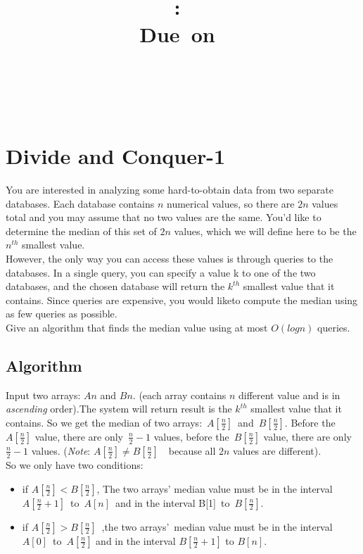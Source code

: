 \documentclass{article}
\title{
\vspace{2in}
\textmd{\textbf{\hmwkClass:\ \hmwkTitle}}\\
\normalsize\vspace{0.1in}\small{Due\ on\ \hmwkDueDate}\\
\vspace{0.1in}\large{\textit{\hmwkClassInstructor\ \hmwkClassTime}}
\vspace{3in}
}
\author{\textbf{\hmwkAuthorName}\\\textbf{\hmwkAuthorStuID}}
\date{} %
\begin{document}
\maketitle
\newpage



\section{Divide and Conquer-1}
    You are interested in analyzing some hard-to-obtain data from two separate databases. Each
    database contains $n$  numerical values, so there are $2n$  values total and you may assume that no
    two values are the same. You’d like to determine the median of this set of $2n$ values, which we
    will define here to be the $n^{th}$ smallest value.\\
    However, the only way you can access these values is through queries to the databases. In
    a single query, you can specify a value k to one of the two databases, and the chosen database
    will return the $k^{th}$ smallest value that it contains. Since queries are expensive, you would liketo compute the median using as few queries as possible. \\
    Give an algorithm that finds the median value using at most $O(logn)$ queries.
    \subsection{Algorithm}
    Input two arrays: $An$ and $Bn$. (each array contains $n$ different value and is in \emph{ascending} order).The system will return result is the $k^{th}$ smallest value that it contains.
    So we get the median of two arrays: $A[\frac{n}{2}]$ and $B[\frac{n}{2}]$. Before the $A[\frac{n}{2}]$ value, there are only $\frac{n}{2}-1$ values, before the $B[\frac{n}{2}]$ value, there are only $\frac{n}{2}-1$ values. (\emph{Note}: $A[\frac{n}{2}] \neq B[\frac{n}{2}]$  because all $2n$ values are different). \\
    So we only have two conditions:
    \begin{itemize}
    \item if $A[\frac{n}{2}] < B[\frac{n}{2}]$, The two arrays’ median value must be in the interval $A[\frac{n}{2}+1]$ to $A[n]$ and in the interval B[1] to $B[\frac{n}{2}]$. 
    \item if $A[\frac{n}{2}] > B[\frac{n}{2}]$ ,the two arrays’ median value must be in the interval $A[0]$ to $A[\frac{n}{2}]$ and in the interval $B[\frac{n}{2}+1]$ to $B[n]$.
    \end{itemize}
    
\end{document}
